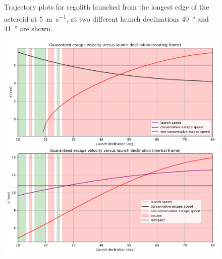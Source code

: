 \documentclass[print]{tudelft-report}
\begin{document}
\begin{appendices}
\begin{figure}[htb]
    \caption{Trajectory plots for regolith launched from the longest edge of the asteroid at \SI{5}{\metre\per\second}, at two different launch declinations \protect{} \SI{40}{\degree} and \protect{} \SI{41}{\degree} are shown.}
    \label{fig:non_conservative_5ms_40and41_declination}
    \end{figure}
    \FloatBarrier
    \begin{figure}[htb]
    \centering
    \captionsetup{justification=centering}
    \includegraphics[width=\textwidth, height=0.5\textheight, keepaspectratio=true]{Results/Images/non_conservative_escape_speed/qinfinity_dot7alpha_plus.pdf}

\end{figure}
\end{appendices}
\end{document}
